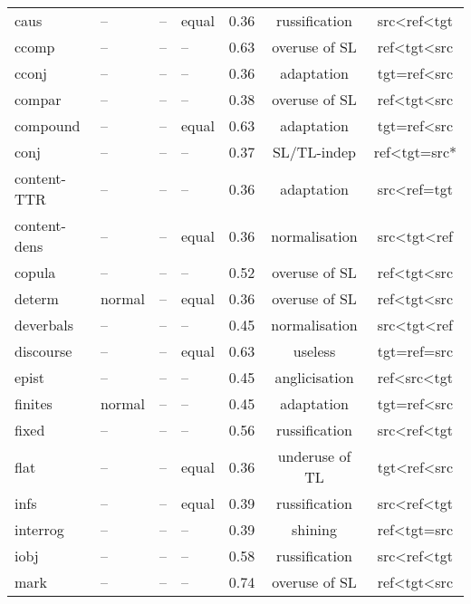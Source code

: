 \begin{longtable}{l|p{2cm}p{2cm}p{1.5cm}ccc}
	caus          & -- & -- & equal & 0.36    & russification  & src\textless{}ref\textless{}tgt \\
	ccomp         & -- & -- & -- & 0.63    & overuse of SL  & ref\textless{}tgt\textless{}src \\
	cconj         & -- & -- & -- & 0.36    & adaptation     & tgt=ref\textless{}src           \\
	compar        & -- & -- & -- & 0.38    & overuse of SL  & ref\textless{}tgt\textless{}src \\
	compound      & -- & -- & equal & 0.63    & adaptation     & tgt=ref\textless{}src           \\
	conj          & -- & --& -- & 0.37    & SL/TL-indep    & ref\textless{}tgt=src*          \\
	content-TTR  & -- & -- & -- & 0.36    & adaptation     & src\textless{}ref=tgt        \\
	content-dens & -- & -- & equal& 0.36    & normalisation  & src\textless{}tgt\textless{}ref \\
	copula        & -- & -- & --& 0.52 & overuse of SL  & ref\textless{}tgt\textless{}src \\
	determ        & normal       & -- & equal & 0.36    & overuse of SL  & ref\textless{}tgt\textless{}src \\
	deverbals     & -- & -- & -- & 0.45 & normalisation  & src\textless{}tgt\textless{}ref \\
	discourse     & -- & -- & equal & 0.63    & useless  & tgt=ref=src                     \\
	epist         & -- & -- & -- & 0.45 & anglicisation  & ref\textless{}src\textless{}tgt \\
	finites       & normal       & -- & -- & 0.45 & adaptation     & tgt=ref\textless{}src           \\
	fixed         & -- & -- & --       & 0.56    & russification  & src\textless{}ref\textless{}tgt \\
	flat          & -- & -- & equal    & 0.36    & underuse of TL  & tgt\textless{}ref\textless{}src \\
	infs          & -- & -- & equal    & 0.39    & russification  & src\textless{}ref\textless{}tgt \\
	interrog      & -- & -- & --       & 0.39    & shining        & ref\textless{}tgt=src           \\
	iobj          & -- & -- & --       & 0.58    & russification  & src\textless{}ref\textless{}tgt \\
	mark          & -- & -- & --       & 0.74    & overuse of SL  & ref\textless{}tgt\textless{}src \\

\end{longtable}
